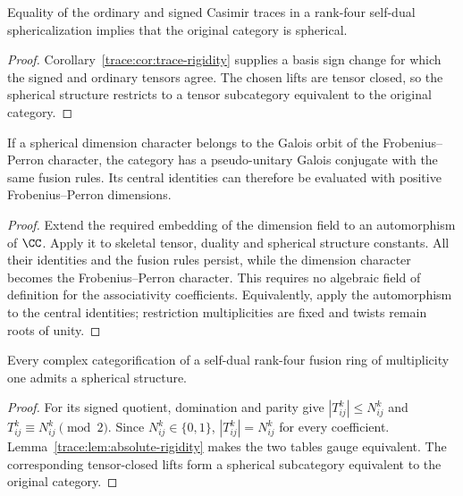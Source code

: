 \begin{corollary}\label{core:trace-spherical}
Equality of the ordinary and signed Casimir traces in a rank-four
self-dual sphericalization implies that the original category is spherical.
\end{corollary}
\begin{proof}
Corollary~\ref{trace:cor:trace-rigidity} supplies a basis sign change
for which the signed and ordinary tensors agree. The chosen lifts
are tensor closed, so the spherical structure restricts to a tensor
subcategory equivalent to the original category.
\end{proof}

\begin{lemma}\label{core:lem:galois-transport}
If a spherical dimension character belongs to the Galois orbit of the
Frobenius--Perron character, the category has a pseudo-unitary Galois
conjugate with the same fusion rules. Its central identities can
therefore be evaluated with positive Frobenius--Perron dimensions.
\end{lemma}
\begin{proof}
Extend the required embedding of the dimension field to an automorphism
of $\CC$. Apply it to skeletal tensor, duality and spherical
structure constants. All their identities and the fusion rules persist,
while the dimension character becomes the Frobenius--Perron character.
This requires no algebraic field of definition for the associativity
coefficients. Equivalently, apply the automorphism to the central
identities; restriction multiplicities are fixed and twists remain
roots of unity.
\end{proof}

\begin{corollary}
\label{core:cor:multiplicity-one-spherical}
Every complex categorification of a self-dual rank-four fusion ring
of multiplicity one admits a spherical structure.
\end{corollary}
\begin{proof}
For its signed quotient, domination and parity give
$|T_{ij}^{k}|\le N_{ij}^{k}$ and
$T_{ij}^{k}\equiv N_{ij}^{k}\pmod2$. Since $N_{ij}^{k}\in\{0,1\}$,
$|T_{ij}^{k}|=N_{ij}^{k}$ for every coefficient.
Lemma~\ref{trace:lem:absolute-rigidity} makes the two tables gauge
equivalent. The corresponding tensor-closed lifts form a spherical
subcategory equivalent to the original category.
\end{proof}


